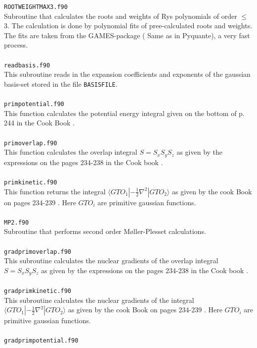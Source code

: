 \documentclass[a4paper,twoside,openany]{book}
\begin{document}
{{ \texttt{ROOTWEIGHTMAX3.f90}\\
Subroutine that calculates the roots and weights of  Rys polynomials of order $\leq$ 3. The calculation is done by 
polynomial fits of pree-calculated roots and weights. The fits are taken from the GAMES-package ( Same as in Pyquante), a very fast process. \\ \\
\texttt{readbasis.f90}\\
This subroutine reads in the expansion coefficients and exponents of the gaussian basis-set stored in the file \texttt{BASISFILE}.\\ \\
\texttt{primpotential.f90}\\
This function calculates the potential energy integral given on the
bottom of p. 244 in the Cook Book \cite{Cook}. \\ \\
\texttt{primoverlap.f90}\\
This function calculates the overlap integral
$S = S_{x}S_{y}S_{z}$ as given by the expressions 
on the pages 234-238 in the Cook book \cite{Cook}. \\ \\
\texttt{primkinetic.f90} \\
 This function returns the integral
$\langle GTO_{1} | -\frac{1}{2}\nabla^{2} | GTO_{2} \rangle$
as given by the cook Book on pages 234-239 \cite{Cook}. Here $GTO_{i}$ are primitive gaussian functions. \\ \\
\texttt{MP2.f90}\\
Subroutine that performs second order  M\o ller-Plesset calculations. \\ \\
\texttt{gradprimoverlap.f90}\\
This subroutine  calculates the nuclear gradients of the overlap integral
$S = S_{x}S_{y}S_{z}$ as given by the expressions 
on the pages 234-238 in the Cook book \cite{Cook}. \\ \\
\texttt{gradprimkinetic.f90}\\
 This subroutine calculates  the nuclear gradients of the integral
$\langle GTO_{1} | -\frac{1}{2}\nabla^{2} | GTO_{2} \rangle$
as given by the cook Book on pages 234-239 \cite{Cook}. Here $GTO_{i}$ are primitive gaussian functions. \\ \\
\texttt{gradprimpotential.f90}\\
}}
\end{document}
